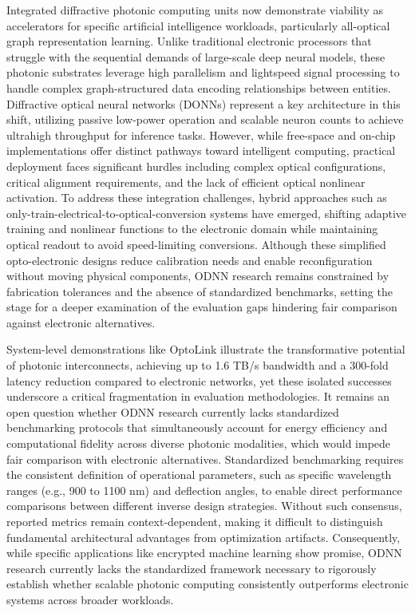 Integrated diffractive photonic computing units now demonstrate viability as accelerators for specific artificial intelligence workloads, particularly all-optical graph representation learning. Unlike traditional electronic processors that struggle with the sequential demands of large-scale deep neural models, these photonic substrates leverage high parallelism and lightspeed signal processing to handle complex graph-structured data encoding relationships between entities. Diffractive optical neural networks (DONNs) represent a key architecture in this shift, utilizing passive low-power operation and scalable neuron counts to achieve ultrahigh throughput for inference tasks. However, while free-space and on-chip implementations offer distinct pathways toward intelligent computing, practical deployment faces significant hurdles including complex optical configurations, critical alignment requirements, and the lack of efficient optical nonlinear activation. To address these integration challenges, hybrid approaches such as only-train-electrical-to-optical-conversion systems have emerged, shifting adaptive training and nonlinear functions to the electronic domain while maintaining optical readout to avoid speed-limiting conversions. Although these simplified opto-electronic designs reduce calibration needs and enable reconfiguration without moving physical components, ODNN research remains constrained by fabrication tolerances and the absence of standardized benchmarks, setting the stage for a deeper examination of the evaluation gaps hindering fair comparison against electronic alternatives. \citep{doi_10_1126_sciadv_abn7630_4399f2ff} \citep{doi_10_1002_nap2_70098_8d5f2f8a} \citep{doi_10_1364_oe_462370_1269b480}

System-level demonstrations like OptoLink illustrate the transformative potential of photonic interconnects, achieving up to 1.6 TB/s bandwidth and a 300-fold latency reduction compared to electronic networks, yet these isolated successes underscore a critical fragmentation in evaluation methodologies. It remains an open question whether ODNN research currently lacks standardized benchmarking protocols that simultaneously account for energy efficiency and computational fidelity across diverse photonic modalities, which would impede fair comparison with electronic alternatives. Standardized benchmarking requires the consistent definition of operational parameters, such as specific wavelength ranges (e.g., 900 to 1100 nm) and deflection angles, to enable direct performance comparisons between different inverse design strategies. Without such consensus, reported metrics remain context-dependent, making it difficult to distinguish fundamental architectural advantages from optimization artifacts. Consequently, while specific applications like encrypted machine learning show promise, ODNN research currently lacks the standardized framework necessary to rigorously establish whether scalable photonic computing consistently outperforms electronic systems across broader workloads. \citep{doi_10_1145_3806395_315ab915} \citep{doi_10_1515_nanoph_2023_0852_cb27a26f} \citep{s2_9b444e84d20ae6e3d62d2d4df30268b5a53baad2_40af2cc9}

